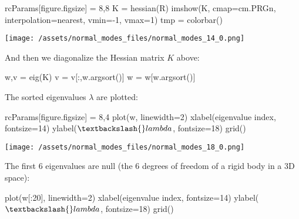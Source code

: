 \documentclass[
]{article}
\newenvironment{Shaded}{}{}
\newcommand{\DecValTok}[1]{\textcolor[rgb]{0.25,0.63,0.44}{#1}}
\newcommand{\NormalTok}[1]{#1}
\newcommand{\OperatorTok}[1]{\textcolor[rgb]{0.40,0.40,0.40}{#1}}
\newcommand{\StringTok}[1]{\textcolor[rgb]{0.25,0.44,0.63}{#1}}
\begin{document}
\begin{Shaded}
\begin{Highlighting}[]
\NormalTok{rcParams[}\StringTok{\textquotesingle{}figure.figsize\textquotesingle{}}\NormalTok{] }\OperatorTok{=} \DecValTok{8}\NormalTok{,}\DecValTok{8}
\NormalTok{K }\OperatorTok{=}\NormalTok{ hessian(R)}
\NormalTok{imshow(K, cmap}\OperatorTok{=}\NormalTok{cm.PRGn, interpolation}\OperatorTok{=}\StringTok{\textquotesingle{}nearest\textquotesingle{}}\NormalTok{, vmin}\OperatorTok{={-}}\DecValTok{1}\NormalTok{, vmax}\OperatorTok{=}\DecValTok{1}\NormalTok{)}
\NormalTok{tmp }\OperatorTok{=}\NormalTok{ colorbar()}
\end{Highlighting}
\end{Shaded}

\texttt{[image: /assets/normal\_modes\_files/normal\_modes\_14\_0.png]}

And then we diagonalize the Hessian matrix \(K\) above:

\begin{Shaded}
\begin{Highlighting}[]
\NormalTok{w,v }\OperatorTok{=}\NormalTok{ eig(K)}
\NormalTok{v }\OperatorTok{=}\NormalTok{ v[:,w.argsort()]}
\NormalTok{w }\OperatorTok{=}\NormalTok{ w[w.argsort()]}
\end{Highlighting}
\end{Shaded}

The sorted eigenvalues \(\lambda\) are plotted:

\begin{Shaded}
\begin{Highlighting}[]
\NormalTok{rcParams[}\StringTok{\textquotesingle{}figure.figsize\textquotesingle{}}\NormalTok{] }\OperatorTok{=} \DecValTok{8}\NormalTok{,}\DecValTok{4}
\NormalTok{plot(w, linewidth}\OperatorTok{=}\DecValTok{2}\NormalTok{)}
\NormalTok{xlabel(}\StringTok{\textquotesingle{}eigenvalue index\textquotesingle{}}\NormalTok{, fontsize}\OperatorTok{=}\DecValTok{14}\NormalTok{)}
\NormalTok{ylabel(}\StringTok{\textquotesingle{}$\textbackslash{}lambda$\textquotesingle{}}\NormalTok{, fontsize}\OperatorTok{=}\DecValTok{18}\NormalTok{)}
\NormalTok{grid()}
\end{Highlighting}
\end{Shaded}

\texttt{[image: /assets/normal\_modes\_files/normal\_modes\_18\_0.png]}

The first 6 eigenvalues are null (the 6 degrees of freedom of a rigid
body in a 3D space):

\begin{Shaded}
\begin{Highlighting}[]
\NormalTok{plot(w[:}\DecValTok{20}\NormalTok{], linewidth}\OperatorTok{=}\DecValTok{2}\NormalTok{)}
\NormalTok{xlabel(}\StringTok{\textquotesingle{}eigenvalue index\textquotesingle{}}\NormalTok{, fontsize}\OperatorTok{=}\DecValTok{14}\NormalTok{)}
\NormalTok{ylabel(}\StringTok{\textquotesingle{}$\textbackslash{}lambda$\textquotesingle{}}\NormalTok{, fontsize}\OperatorTok{=}\DecValTok{18}\NormalTok{)}
\NormalTok{grid()}
\end{Highlighting}
\end{Shaded}
\end{document}
